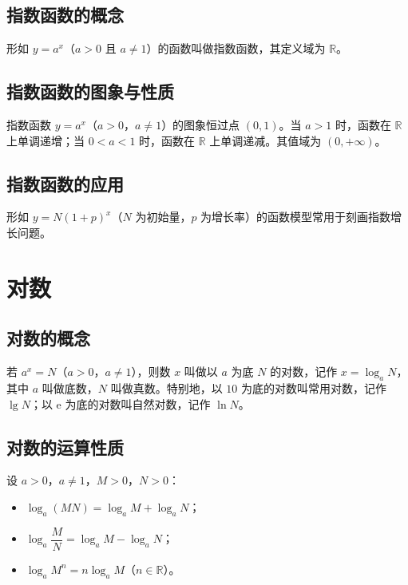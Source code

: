 \subsection{指数函数的概念}
\begin{definition}[指数函数]
形如 $y=a^x$（$a>0$ 且 $a \neq 1$）的函数叫做指数函数，其定义域为 $\mathbb{R}$。
\end{definition}
\subsection{指数函数的图象与性质}
\begin{definition}[指数函数的性质]
指数函数 $y=a^x$（$a>0$，$a \neq 1$）的图象恒过点 $(0,1)$。当 $a>1$ 时，函数在 $\mathbb{R}$ 上单调递增；当 $0<a<1$ 时，函数在 $\mathbb{R}$ 上单调递减。其值域为 $(0,+\infty)$。
\end{definition}
\subsection{指数函数的应用}
\begin{definition}[指数增长模型]
形如 $y=N(1+p)^x$（$N$ 为初始量，$p$ 为增长率）的函数模型常用于刻画指数增长问题。
\end{definition}

\section{对数}
\subsection{对数的概念}
\begin{definition}[对数]
若 $a^x=N$（$a>0$，$a \neq 1$），则数 $x$ 叫做以 $a$ 为底 $N$ 的对数，记作 $x=\log_a N$，其中 $a$ 叫做底数，$N$ 叫做真数。特别地，以 $10$ 为底的对数叫常用对数，记作 $\lg N$；以 $\mathrm{e}$ 为底的对数叫自然对数，记作 $\ln N$。
\end{definition}
\subsection{对数的运算性质}
\begin{definition}[对数的运算性质]
设 $a>0$，$a \neq 1$，$M>0$，$N>0$：
\begin{itemize}
    \item $\log_a(MN)=\log_a M+\log_a N$；
    \item $\log_a \dfrac{M}{N}=\log_a M-\log_a N$；
    \item $\log_a M^n=n\log_a M$（$n \in \mathbb{R}$）。
\end{itemize}
\end{definition}
